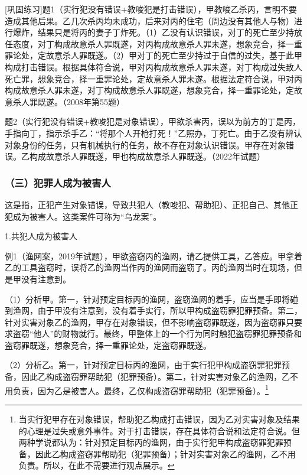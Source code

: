[巩固练习]题1（实行犯没有错误+教唆犯是打击错误），甲教唆乙杀丙，言明不要造成其他后果。乙几次杀丙均未成功，后来对丙的住宅（周边没有其他人与物）进行爆炸，结果只是将丙的妻子丁炸死。（1）乙没有认识错误，对丁的死亡至少持放任态度，对丁构成故意杀人罪既遂，对丙构成故意杀人罪未遂，想象竞合，择一重罪论处，定故意杀人罪既遂。（2）甲对丁的死亡至少持过于自信的过失，基于此甲构成打击错误。根据具体符合说，甲对丙构成故意杀人罪未遂，对丁构成过失致人死亡罪，想象竞合，择一重罪论处，定故意杀人罪未遂。根据法定符合说，甲对丙构成故意杀人罪未遂，对丁构成故意杀人罪既遂，想象竞合，择一重罪论处，定故意杀人罪既遂。（2008年第55题）

题2（实行犯没有错误+教唆犯是对象错误），甲欲杀害丙，误以为前方的丁是丙，手指向丁，指示杀手乙：“将那个人开枪打死！”乙照办，丁死亡。由于乙没有辨认对象身份的任务，只有机械执行的任务，故不存在对象认识错误。甲存在对象错误。乙构成故意杀人罪既遂，甲也构成故意杀人罪既遂。（2022年试题）

\subsubsection*{（三）犯罪人成为被害人}

这是指，正犯产生对象错误，导致共犯人（教唆犯、帮助犯）、正犯自己、其他正犯成为被害人。这类案件可称为“乌龙案”。

1.共犯人成为被害人

例1（渔网案，2019年试题），甲欲盗窃丙的渔网，请乙提供工具，乙答应。甲拿着乙的工具盗窃时，误将乙的渔网当作丙的渔网而盗窃了。丙的渔网当时在现场，但是甲没有注意到。

（1）分析甲。第一，针对预定目标丙的渔网，盗窃渔网的着手，应当是手即将碰到渔网，由于甲没有注意到，没有着手实行，所以甲构成盗窃罪犯罪预备。第二，针对实害对象乙的渔网，甲存在对象错误，但不影响盗窃罪既遂，因为盗窃罪只要求盗窃“他人”的财物就行。最终，甲整体上的一个行为同时触犯盗窃罪犯罪预备和盗窃罪既遂，想象竞合，择一重罪论处，定盗窃罪既遂。

（2）分析乙。第一，针对预定目标丙的渔网，由于实行犯甲构成盗窃罪犯罪预备，因此乙构成盗窃罪帮助犯（犯罪预备）。第二，针对实害对象乙的渔网，乙不用负责，因为乙是被害人。最终，乙仅构成盗窃罪帮助犯（犯罪预备）。\footnote{当实行犯甲存在对象错误，帮助犯乙构成打击错误，因为乙对实害对象及结果的心理是过失或意外事件。对于打击错误，存在具体符合说和法定符合说。但两种学说都认为：针对预定目标丙的渔网，由于实行犯甲构成盗窃罪犯罪预备，因此乙构成盗窃罪帮助犯（犯罪预备）；针对实害对象乙的渔网，乙不用负责。所以，在此不需要进行观点展示。}

